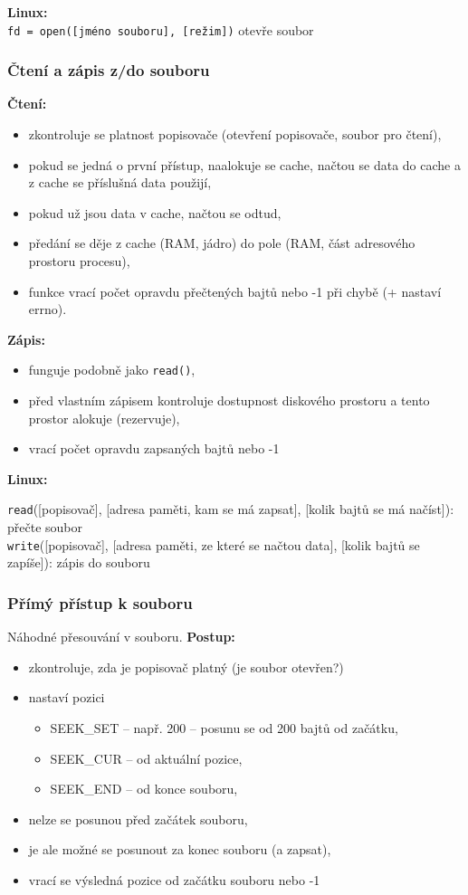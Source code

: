 \documentclass[a4paper, 11pt]{article}
\newcommand{\tcmd}[1]{\texttt{#1}}
\begin{document}
\textbf{Linux:} \\
\tcmd{fd = open([jméno souboru], [režim])} otevře soubor

\subsubsection{Čtení a zápis z/do souboru}
\textbf{Čtení:}
\begin{itemize}
    \item zkontroluje se platnost popisovače (otevření popisovače, soubor pro čtení),
    \item pokud se jedná o první přístup, naalokuje se cache, načtou se data do cache a z cache se příslušná data použijí,
    \item pokud už jsou data v cache, načtou se odtud,
    \item předání se děje z cache (RAM, jádro) do pole (RAM, část adresového prostoru procesu),
    \item funkce vrací počet opravdu přečtených bajtů nebo -1 při chybě (+ nastaví errno).
\end{itemize}

\textbf{Zápis:}
\begin{itemize}
    \item funguje podobně jako \tcmd{read()},
    \item před vlastním zápisem kontroluje dostupnost diskového prostoru a tento prostor alokuje (rezervuje),
    \item vrací počet opravdu zapsaných bajtů nebo -1
\end{itemize}
 
\textbf{Linux:}

\tcmd{read}([popisovač], [adresa paměti, kam se má zapsat], [kolik bajtů se má načíst]): přečte soubor \\[0.2em]
\tcmd{write}([popisovač], [adresa paměti, ze které se načtou data], [kolik bajtů se zapíše]): zápis do souboru
 
\subsubsection{Přímý přístup k souboru}
Náhodné přesouvání v souboru. \textbf{Postup:}
\begin{itemize}
    \item zkontroluje, zda je popisovač platný (je soubor otevřen?)
    \item nastaví pozici
    \begin{itemize}
        \item SEEK\_SET -- např. 200 -- posunu se od 200 bajtů od začátku,
        \item SEEK\_CUR -- od aktuální pozice,
        \item SEEK\_END -- od konce souboru,
    \end{itemize}
    \item nelze se posunou před začátek souboru,
    \item je ale možné se posunout za konec souboru (a zapsat),
    \item vrací se výsledná pozice od začátku souboru nebo -1
\end{itemize}
 
\end{document}

